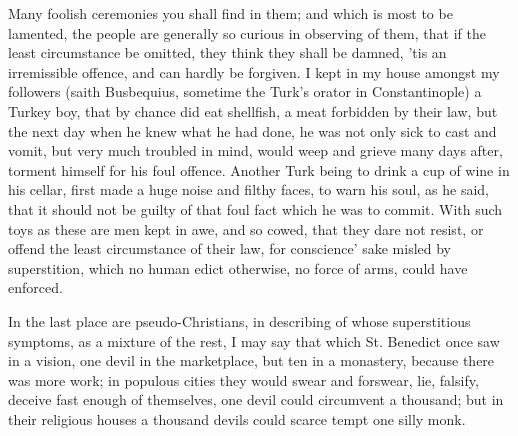 {Many foolish ceremonies you shall find in them; and which is most to be
lamented, the people are generally so curious in observing of them,
that if the least circumstance be omitted, they think they shall be
damned, 'tis an irremissible offence, and can hardly be forgiven. I
kept in my house amongst my followers (saith Busbequius, sometime the
Turk's orator in Constantinople) a Turkey boy, that by chance did eat
shellfish, a meat forbidden by their law, but the next day when he knew
what he had done, he was not only sick to cast and vomit, but very much
troubled in mind, would weep and grieve many days after, torment
himself for his foul offence. Another Turk being to drink a cup of wine
in his cellar, first made a huge noise and filthy faces, to warn
his soul, as he said, that it should not be guilty of that foul fact
which he was to commit. With such toys as these are men kept in awe,
and so cowed, that they dare not resist, or offend the least
circumstance of their law, for conscience' sake misled by superstition,
which no human edict otherwise, no force of arms, could have enforced.

In the last place are pseudo-Christians, in describing of whose
superstitious symptoms, as a mixture of the rest, I may say that which
St. Benedict once saw in a vision, one devil in the marketplace, but
ten in a monastery, because there was more work; in populous cities
they would swear and forswear, lie, falsify, deceive fast enough of
themselves, one devil could circumvent a thousand; but in their
religious houses a thousand devils could scarce tempt one silly monk.

}
